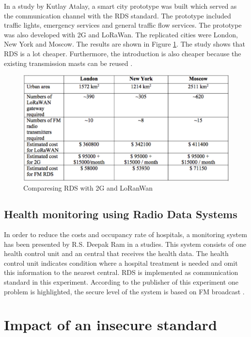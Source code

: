 \documentclass[conference,12pt,a4paper]{IEEEtran}
\begin{document}
	In a study by Kutlay Atalay, a smart city prototype was built which served as the communication channel with the RDS standard. The prototype included traffic lights, emergency services and general traffic flow services. The prototype was also developed with 2G and LoRaWan. The replicated cities were London, New York and Moscow. The results are shown in Figure \ref{fig: smartCity}. The study shows that RDS is a lot cheaper. Furthermore, the introduction is also cheaper because the existing transmission masts can be reused \cite{SmartCity-kutlay2019rds}.
	
	\begin{figure}[h]
		\centering
		\includegraphics[width = \linewidth]{img/smartCity}
		\caption{Comparesing RDS with 2G and LoRanWan}
		\label{fig: smartCity}
	\end{figure}
	
	\subsection{Health monitoring using Radio Data Systems}
	
	In order to reduce the costs and occupancy rate of hospitals, a monitoring system has been presented by R.S. Deepak Ram in a studies. This system consists of one health control unit and an central that receives the health data. The health control unit indicates condition where a hospital treatment is needed and omit this information to the nearest central. RDS is implemented as communication standard in this experiment. According to the publisher of this experiment one problem is highlighted, the secure level of the system is based on FM broadcast \cite{Healthcare-ram2015health}. \\
	
	\section{Impact of an insecure standard}
	
\end{document}
